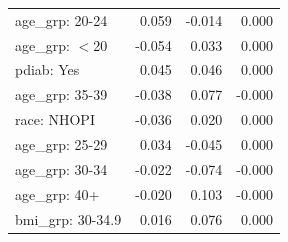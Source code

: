 {\begin{longtable}{lrrr}
age\_grp: 20-24 & 0.059 & -0.014 & 0.000 \\
age\_grp: $<$20 & -0.054 & 0.033 & 0.000 \\
pdiab: Yes & 0.045 & 0.046 & 0.000 \\
age\_grp: 35-39 & -0.038 & 0.077 & -0.000 \\
race: NHOPI & -0.036 & 0.020 & 0.000 \\
age\_grp: 25-29 & 0.034 & -0.045 & 0.000 \\
age\_grp: 30-34 & -0.022 & -0.074 & -0.000 \\
age\_grp: 40+ & -0.020 & 0.103 & -0.000 \\
bmi\_grp: 30-34.9 & 0.016 & 0.076 & 0.000 \\
\bottomrule
\end{longtable}
}
